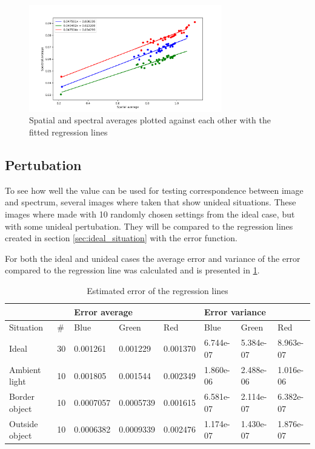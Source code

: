 \begin{figure}[H]
    \centering
    \includegraphics[width=0.75\textwidth]{Plots/spectral_vs_spatial_average_with_regression.png}
    \caption{Spatial and spectral averages plotted against each other with the fitted regression lines}
    \label{fig:spectral_vs_spatial_values}
\end{figure}

\subsection{Pertubation}
To see how well the value can be used for testing correspondence between image and spectrum, several images where taken that show unideal situations. These images where made with 10 randomly chosen settings from the ideal case, but with some unideal pertubation. They will be compared to the regression lines created in section \ref{sec:ideal_situation} with the error function. 

For both the ideal and unideal cases the average error and variance of the error compared to the regression line was calculated and is presented in \ref{tb:error_estimate}.

\begin{table}[H]
    \centering
    \caption{Estimated error of the regression lines}
    \label{tb:error_estimate}
    \begin{tabular}{@{}llllllll@{}}
    \toprule
                   &                 & \multicolumn{3}{l}{Error average} & \multicolumn{3}{l}{Error variance} \\ \midrule
    Situation      & \#              & Blue       & Green     & Red      & Blue       & Green     & Red       \\
    Ideal          & 30              & 0.001261   & 0.001229  & 0.001370 & 6.744e-07  & 5.384e-07 & 8.963e-07 \\
    Ambient light  & 10              & 0.001805   & 0.001544  & 0.002349 & 1.860e-06  & 2.488e-06 & 1.016e-06 \\
    Border object  & 10              & 0.0007057  & 0.0005739 & 0.001615 & 6.581e-07  & 2.114e-07 & 6.382e-07 \\
    Outside object & 10              & 0.0006382  & 0.0009339 & 0.002476 & 1.174e-07  & 1.430e-07 & 1.876e-07 \\ \bottomrule
    \end{tabular}
\end{table}



